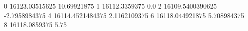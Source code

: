0 16123.03515625 10.69921875
1 16112.3359375 0.0
2 16109.5400390625 -2.7958984375
4 16114.4521484375 2.1162109375
6 16118.044921875 5.708984375
8 16118.0859375 5.75
